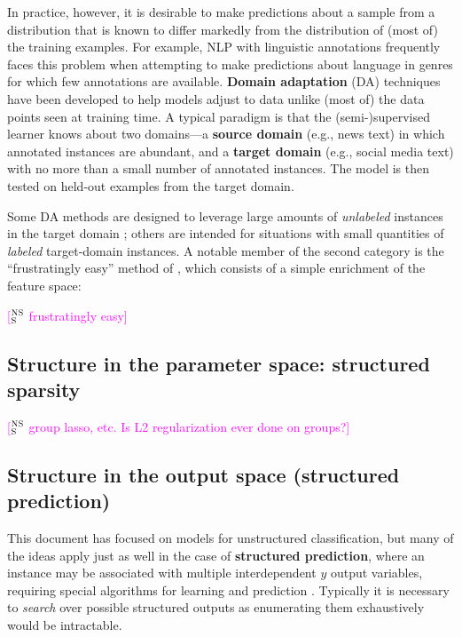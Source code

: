 \documentclass[11pt,letterpaper]{article}
\newcommand{\ensuretext}[1]{#1}
\newcommand{\nssmarker}{\ensuretext{\textcolor{magenta}{\ensuremath{^{\textsc{NS}}_{\textsc{S}}}}}}
\newcommand{\arkcomment}[3]{\ensuretext{\textcolor{#3}{[#1 #2]}}}
\newcommand{\nss}[1]{\arkcomment{\nssmarker}{#1}{magenta}}
\begin{document}
In practice, however, it is desirable to make predictions about a sample 
from a distribution that is known to differ markedly from the distribution 
of (most of) the training examples. For example, NLP with linguistic annotations 
frequently faces this problem when attempting to make predictions about 
language in genres for which few annotations are available. 
\textbf{Domain adaptation} (DA) techniques have been developed to help models adjust  
to data unlike (most of) the data points seen at training time.
A typical paradigm is that the (semi-)supervised learner knows about two domains---a 
\textbf{source domain} (e.g., news text) in which annotated instances are abundant, and 
a \textbf{target domain} (e.g., social media text) with no more than a small number of annotated instances. 
The model is then tested on held-out examples from the target domain. 

Some DA methods are designed to leverage large amounts of \emph{unlabeled} instances 
in the target domain \citep{sogaard-13}; others are intended for situations with small quantities of \emph{labeled} 
target-domain instances. A notable member of the second category 
is the ``frustratingly easy'' method of \citet{daume-07}, 
which consists of a simple enrichment of the feature space:


\nss{frustratingly easy}

\subsection{Structure in the parameter space: structured sparsity}

\nss{group lasso, etc. Is L2 regularization ever done on groups?}


\subsection{Structure in the output space (structured prediction)}

This document has focused on models for unstructured classification, 
but many of the ideas apply just as well in the case of \textbf{structured prediction}, 
where an instance may be associated with multiple interdependent $y$ output variables, 
requiring special algorithms for learning and prediction \citep{smith}.
Typically it is necessary to \emph{search} over possible structured outputs 
as enumerating them exhaustively would be intractable. 
\end{document}
